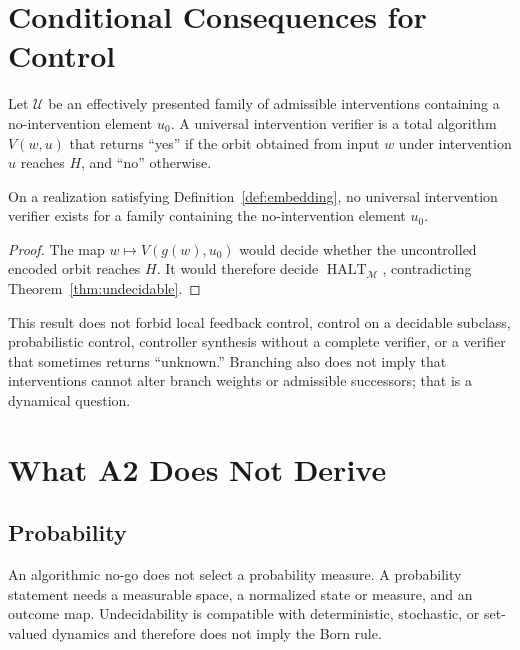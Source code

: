 \documentclass[11pt]{article}
\begin{document}
\section{Conditional Consequences for Control}

\begin{definition}
Let $\mathcal U$ be an effectively presented family of admissible
interventions containing a no-intervention element $u_0$.  A universal
intervention verifier is a total algorithm $V(w,u)$ that returns ``yes'' if
the orbit obtained from input $w$ under intervention $u$ reaches $H$, and
``no'' otherwise.
\end{definition}

\begin{proposition}
\label{prop:control}
On a realization satisfying Definition~\ref{def:embedding}, no universal
intervention verifier exists for a family containing the no-intervention
element $u_0$.
\end{proposition}

\begin{proof}
The map $w\mapsto V(g(w),u_0)$ would decide whether the uncontrolled encoded
orbit reaches $H$.  It would therefore decide
$\operatorname{HALT}_{\mathcal M}$, contradicting
Theorem~\ref{thm:undecidable}.
\end{proof}

This result does not forbid local feedback control, control on a decidable
subclass, probabilistic control, controller synthesis without a complete
verifier, or a verifier that sometimes returns ``unknown.''  Branching also
does not imply that interventions cannot alter branch weights or admissible
successors; that is a dynamical question.

\section{What A2 Does Not Derive}

\subsection{Probability}

An algorithmic no-go does not select a probability measure.  A probability
statement needs a measurable space, a normalized state or measure, and an
outcome map.  Undecidability is compatible with deterministic, stochastic,
or set-valued dynamics and therefore does not imply the Born rule.
\end{document}
